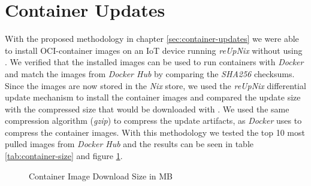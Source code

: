 \section{Container Updates}
With the proposed methodology in chapter \ref{sec:container-updates} we were able
to install \ac{OCI}-container images
on an \ac{IoT} device running \textit{reUpNix} without using .
We verified that the installed images can be used to run containers with \textit{Docker}
and match the images from \textit{Docker Hub} by comparing the \textit{SHA256} checksums.
Since the images are now stored in the \textit{Nix} store, we used the \textit{reUpNix}
differential update mechanism to install the container images and compared the update size
with the compressed size that would be downloaded with . We used
the same compression algorithm (\textit{gzip}) to compress the update artifacts,
as \textit{Docker} uses to compress the container images. With this methodology
we tested the top 10 most pulled images from \textit{Docker Hub} and the results
can be seen in table \ref{tab:container-size} and figure \ref{fig:container-size}.

\begin{figure}[htbp]
  \centering
  \caption{Container Image Download Size in MB}
  \label{fig:container-size}
\end{figure}


